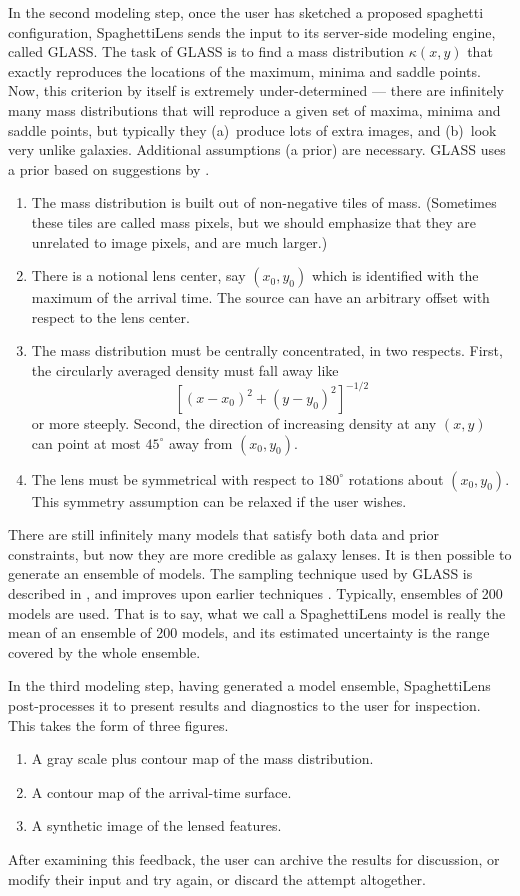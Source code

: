 \documentclass[12pt,preprint]{aastex}
\newcommand{\spl}{SpaghettiLens\xspace}
\begin{document}
In the second modeling step, once the user has sketched a proposed
spaghetti configuration, \spl sends the input to its server-side
modeling engine, called GLASS.  The task of GLASS is to find a mass
distribution $\kappa(x,y)$ that exactly reproduces the locations of
the maximum, minima and saddle points. Now, this criterion by itself
is extremely under-determined --- there are infinitely many mass
distributions that will reproduce a given set of maxima, minima and
saddle points, but typically they (a)~produce lots of extra images,
and (b)~look very unlike galaxies.  Additional assumptions (a prior)
are necessary.  GLASS uses a prior based on suggestions by
\cite{1997MNRAS.292..148S}.
\begin{enumerate}
\item The mass distribution is built out of non-negative tiles of
  mass.  (Sometimes these tiles are called mass pixels, but we should
  emphasize that they are unrelated to image pixels, and are much
  larger.)
\item There is a notional lens center, say $(x_0,y_0)$ which is
  identified with the maximum of the arrival time.  The source can
  have an arbitrary offset with respect to the lens center.
\item The mass distribution must be centrally concentrated, in two
  respects.  First, the circularly averaged density must fall away
  like $$ \left[(x-x_0)^2+(y-y_0)^2\right]^{-1/2}$$ or more steeply.
  Second, the direction of increasing density at any $(x,y)$ can point
  at most $45^\circ$ away from $(x_0,y_0)$.
\item The lens must be symmetrical with respect to $180^\circ$ rotations
  about $(x_0,y_0)$.  This symmetry assumption can be relaxed if the
  user wishes.
\end{enumerate}
There are still infinitely many models that satisfy both data and
prior constraints, but now they are more credible as galaxy lenses.
It is then possible to generate an ensemble of models.  The sampling
technique used by GLASS is described in \citep{Lubini2012}, and
improves upon earlier techniques \citep{2000AJ....119..439W,Saha2004}.
Typically, ensembles of 200 models are used.  That is to say, what we
call a \spl model is really the mean of an ensemble of 200 models, and
its estimated uncertainty is the range covered by the whole ensemble.

In the third modeling step, having generated a model ensemble, \spl
post-processes it to present results and diagnostics to the user for
inspection. This takes the form of three figures.
\begin{enumerate}
\item A gray scale plus contour map of the mass distribution.
\item A contour map of the arrival-time surface.
\item A synthetic image of the lensed features.
\end{enumerate}
After examining this feedback, the user can archive the results for
discussion, or modify their input and try again, or discard the
attempt altogether.
\end{document}

